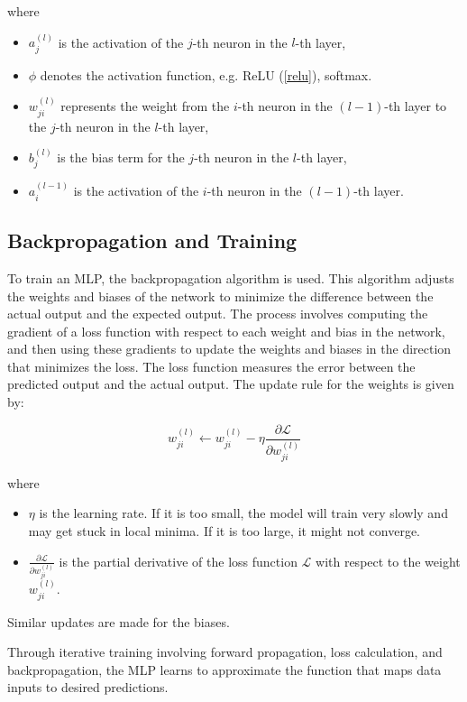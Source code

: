 where
\begin{itemize}
	\item $a^{(l)}_j$ is the activation of the $j$-th neuron in the $l$-th layer,
	\item $\phi$ denotes the activation function, e.g. ReLU (\autoref{relu}), softmax.
	\item $w^{(l)}_{ji}$ represents the weight from the $i$-th neuron in the $(l-1)$-th layer to the $j$-th neuron in the $l$-th layer,
	\item $b^{(l)}_j$ is the bias term for the $j$-th neuron in the $l$-th layer,
	\item $a^{(l-1)}_i$ is the activation of the $i$-th neuron in the $(l-1)$-th layer.
\end{itemize}

\subsection{Backpropagation and Training}

To train an MLP, the backpropagation algorithm is used.
This algorithm adjusts the weights and biases of the network to minimize the difference between the actual output and the expected output.
The process involves computing the gradient of a loss function with respect to each weight and bias in the network, and then using these gradients to update the weights and biases in the direction that minimizes the loss.
The loss function measures the error between the predicted output and the actual output. The update rule for the weights is given by:

\begin{equation}
	w^{(l)}_{ji} \leftarrow w^{(l)}_{ji} - \eta \frac{\partial \mathcal{L}}{\partial w^{(l)}_{ji}}
\end{equation}

where
\begin{itemize}
	\item $\eta$ is the learning rate. If it is too small, the model will train very slowly and may get stuck in local minima. If it is too large, it might not converge.
	\item $\frac{\partial \mathcal{L}}{\partial w^{(l)}_{ji}}$ is the partial derivative of the loss function $\mathcal{L}$ with respect to the weight $w^{(l)}_{ji}$.
\end{itemize}
Similar updates are made for the biases.

Through iterative training involving forward propagation, loss calculation, and backpropagation, the MLP learns to approximate the function that maps data inputs to desired predictions.

